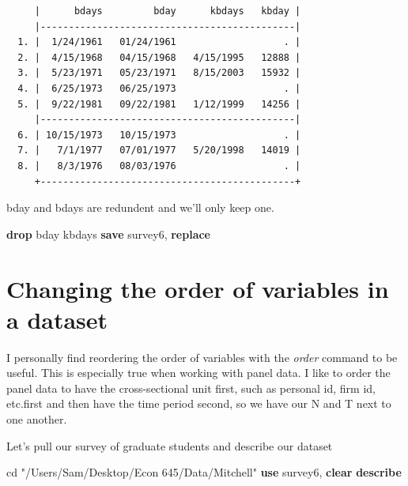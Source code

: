 \documentclass[
]{book}
\newenvironment{Shaded}{\begin{snugshade}}{\end{snugshade}}
\newcommand{\KeywordTok}[1]{\textcolor[rgb]{0.13,0.29,0.53}{\textbf{#1}}}
\newcommand{\NormalTok}[1]{#1}
\newcommand{\StringTok}[1]{\textcolor[rgb]{0.31,0.60,0.02}{#1}}
\begin{document}
\begin{verbatim}
     |      bdays         bday      kbdays   kbday |
     |---------------------------------------------|
  1. |  1/24/1961   01/24/1961                   . |
  2. |  4/15/1968   04/15/1968   4/15/1995   12888 |
  3. |  5/23/1971   05/23/1971   8/15/2003   15932 |
  4. |  6/25/1973   06/25/1973                   . |
  5. |  9/22/1981   09/22/1981   1/12/1999   14256 |
     |---------------------------------------------|
  6. | 10/15/1973   10/15/1973                   . |
  7. |   7/1/1977   07/01/1977   5/20/1998   14019 |
  8. |   8/3/1976   08/03/1976                   . |
     +---------------------------------------------+
\end{verbatim}

bday and bdays are redundent and we'll only keep one.

\begin{Shaded}
\begin{Highlighting}[]
\KeywordTok{drop}\NormalTok{ bday kbdays}
\KeywordTok{save}\NormalTok{ survey6, }\KeywordTok{replace}
\end{Highlighting}
\end{Shaded}

\chapter{Changing the order of variables in a dataset}\label{changing-the-order-of-variables-in-a-dataset}

I personally find reordering the order of variables with the \emph{order} command to be useful. This is especially true when working with panel data. I like to order the panel data to have the cross-sectional unit first, such as personal id, firm id, etc.first and then have the time period second, so we have our N and T next to one another.

Let's pull our survey of graduate students and describe our dataset

\begin{Shaded}
\begin{Highlighting}[]
\NormalTok{cd }\StringTok{"/Users/Sam/Desktop/Econ 645/Data/Mitchell"}
\KeywordTok{use}\NormalTok{ survey6, }\KeywordTok{clear}
\KeywordTok{describe}
\end{Highlighting}
\end{Shaded}
\end{document}
